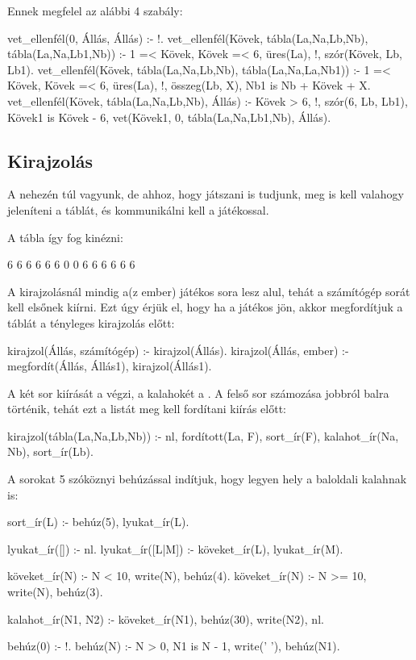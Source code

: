 Ennek megfelel az alábbi 4 szabály:
\begin{program}
vet_ellenfél(0, Állás, Állás) :- !.
vet_ellenfél(Kövek, tábla(La,Na,Lb,Nb),
             tábla(La,Na,Lb1,Nb)) :-
    1 =< Kövek, Kövek =< 6,
    \+ üres(La), !,
    szór(Kövek, Lb, Lb1).
vet_ellenfél(Kövek, tábla(La,Na,Lb,Nb),
             tábla(La,Na,La,Nb1)) :-
    1 =< Kövek, Kövek =< 6,
    üres(La), !,
    összeg(Lb, X), Nb1 is Nb + Kövek + X.
vet_ellenfél(Kövek, tábla(La,Na,Lb,Nb), Állás) :-
    Kövek > 6, !,
    szór(6, Lb, Lb1),
    Kövek1 is Kövek - 6,
    vet(Kövek1, 0, tábla(La,Na,Lb1,Nb), Állás).
\end{program}

\subsection*{Kirajzolás}
A nehezén túl vagyunk, de ahhoz, hogy játszani is
tudjunk, meg is kell valahogy jeleníteni a táblát,
és kommunikálni kell a játékossal.

A tábla így fog kinézni:
\begin{query}
     6    6    6    6    6    6
0                                  0
     6    6    6    6    6    6
\end{query}

A kirajzolásnál mindig a(z ember) játékos sora lesz
alul, tehát a számítógép sorát kell elsőnek
kiírni. Ezt úgy érjük el, hogy ha a játékos jön,
akkor megfordítjuk a táblát a tényleges kirajzolás
előtt:
\begin{program}
kirajzol(Állás, számítógép) :- kirajzol(Állás).
kirajzol(Állás, ember) :-
    megfordít(Állás, Állás1),
    kirajzol(Állás1).
\end{program}

A két sor kiírását a  végzi, a
kalahokét a . A felső sor számozása
jobbról balra történik, tehát ezt a listát meg kell
fordítani kiírás előtt:
\begin{program}
kirajzol(tábla(La,Na,Lb,Nb)) :-
    nl,
    fordított(La, F),
    sort_ír(F),
    kalahot_ír(Na, Nb),
    sort_ír(Lb).
\end{program}

A sorokat 5 szóköznyi behúzással indítjuk, hogy
legyen hely a baloldali kalahnak is:
\begin{program}
sort_ír(L) :- behúz(5), lyukat_ír(L).

lyukat_ír([]) :- nl.
lyukat_ír([L|M]) :- köveket_ír(L), lyukat_ír(M).

köveket_ír(N) :- N < 10, write(N), behúz(4).
köveket_ír(N) :- N >= 10, write(N), behúz(3).

kalahot_ír(N1, N2) :-
    köveket_ír(N1), behúz(30),
    write(N2), nl.

behúz(0) :- !.
behúz(N) :-
    N > 0, N1 is N - 1,
    write(' '), behúz(N1).
\end{program}

